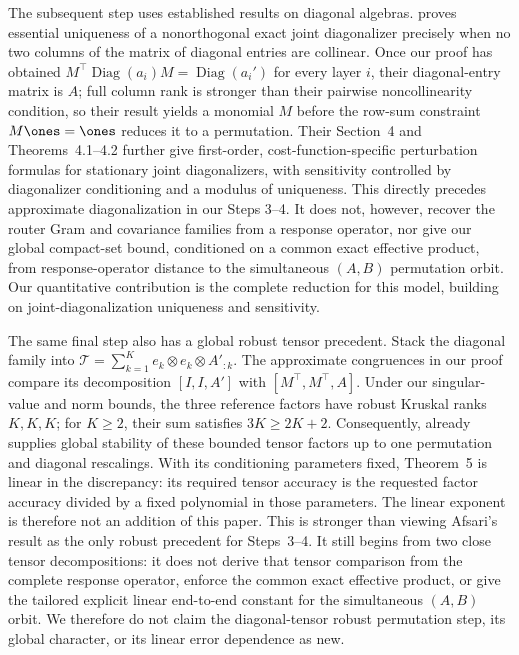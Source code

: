 The subsequent step uses established results on diagonal algebras.
\citet[Theorem~2.3]{afsari2008sensitivity} proves essential uniqueness of a
nonorthogonal exact joint diagonalizer precisely when no two columns of the
matrix of diagonal entries are collinear.  Once our proof has obtained
\(M^\top\operatorname{Diag}(a_i)M=\operatorname{Diag}(a_i')\) for every
layer \(i\), their diagonal-entry matrix is \(A\); full column rank is stronger
than their pairwise noncollinearity condition, so their result yields a
monomial \(M\) before the row-sum constraint \(M\ones=\ones\) reduces it to a
permutation.  Their Section~4 and Theorems~4.1--4.2 further give first-order,
cost-function-specific perturbation formulas for stationary joint
diagonalizers, with sensitivity controlled by diagonalizer conditioning and a
modulus of uniqueness.  This directly precedes approximate diagonalization in
our Steps 3--4.  It does not, however, recover the router Gram and covariance
families from a response operator, nor give our global compact-set bound,
conditioned on a common exact effective product, from response-operator
distance to the simultaneous \((A,B)\) permutation orbit.  Our quantitative contribution is the complete reduction for this model,
building on joint-diagonalization uniqueness and sensitivity.

The same final step also has a global robust tensor precedent.  Stack the
diagonal family into
\(\mathcal T=\sum_{k=1}^K e_k\otimes e_k\otimes A'_{:k}\).  The approximate
congruences in our proof compare its decomposition \([I,I,A']\) with
\([M^\top,M^\top,A]\).  Under our singular-value and norm bounds, the three
reference factors have robust Kruskal ranks \(K,K,K\); for \(K\ge2\), their
sum satisfies \(3K\ge2K+2\).  Consequently,
\citet[Theorem~5]{bhaskara2014uniqueness} already supplies global stability of these bounded tensor factors up to
one permutation and diagonal rescalings. With its conditioning parameters
fixed, Theorem~5 is linear in the discrepancy: its required tensor accuracy
is the requested factor accuracy divided by a fixed polynomial in those
parameters. The linear exponent is therefore not an addition of this paper.  This is stronger than viewing Afsari's result as the only robust
precedent for Steps~3--4.  It still begins from two close tensor
decompositions: it does not derive that tensor comparison from the complete
response operator, enforce the common exact effective product, or give the
tailored explicit linear end-to-end constant for the simultaneous \((A,B)\)
orbit. We therefore do not claim the diagonal-tensor robust permutation
step, its global character, or its linear error dependence as new.

